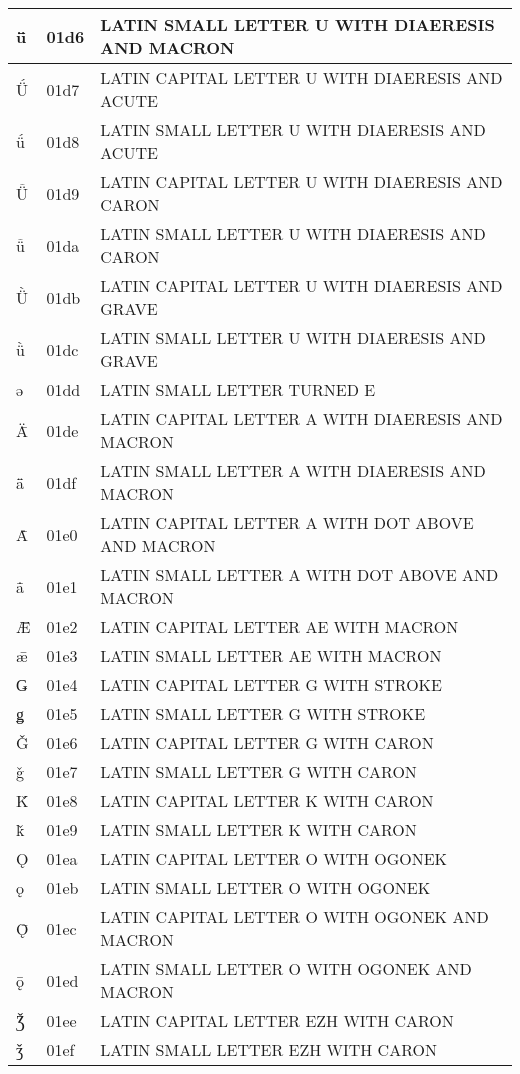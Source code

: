 \documentclass[12pt,letterpaper,openany]{book}
\begin{document}
\begin{center}
\begin{supertabular}{|m{0.25in}|m{0.5in}|m{4in}|}
			ǖ & 01d6 & LATIN SMALL LETTER U WITH DIAERESIS AND MACRON\\\hline
			Ǘ & 01d7 & LATIN CAPITAL LETTER U WITH DIAERESIS AND ACUTE\\\hline
			ǘ & 01d8 & LATIN SMALL LETTER U WITH DIAERESIS AND ACUTE\\\hline
			Ǚ & 01d9 & LATIN CAPITAL LETTER U WITH DIAERESIS AND CARON\\\hline
			ǚ & 01da & LATIN SMALL LETTER U WITH DIAERESIS AND CARON\\\hline
			Ǜ & 01db & LATIN CAPITAL LETTER U WITH DIAERESIS AND GRAVE\\\hline
			ǜ & 01dc & LATIN SMALL LETTER U WITH DIAERESIS AND GRAVE\\\hline
			ǝ & 01dd & LATIN SMALL LETTER TURNED E\\\hline
			Ǟ & 01de & LATIN CAPITAL LETTER A WITH DIAERESIS AND MACRON\\\hline
			ǟ & 01df & LATIN SMALL LETTER A WITH DIAERESIS AND MACRON\\\hline
			Ǡ & 01e0 & LATIN CAPITAL LETTER A WITH DOT ABOVE AND MACRON\\\hline
			ǡ & 01e1 & LATIN SMALL LETTER A WITH DOT ABOVE AND MACRON\\\hline
			Ǣ & 01e2 & LATIN CAPITAL LETTER AE WITH MACRON\\\hline
			ǣ & 01e3 & LATIN SMALL LETTER AE WITH MACRON\\\hline
			Ǥ & 01e4 & LATIN CAPITAL LETTER G WITH STROKE\\\hline
			ǥ & 01e5 & LATIN SMALL LETTER G WITH STROKE\\\hline
			Ǧ & 01e6 & LATIN CAPITAL LETTER G WITH CARON\\\hline
			ǧ & 01e7 & LATIN SMALL LETTER G WITH CARON\\\hline
			Ǩ & 01e8 & LATIN CAPITAL LETTER K WITH CARON\\\hline
			ǩ & 01e9 & LATIN SMALL LETTER K WITH CARON\\\hline
			Ǫ & 01ea & LATIN CAPITAL LETTER O WITH OGONEK\\\hline
			ǫ & 01eb & LATIN SMALL LETTER O WITH OGONEK\\\hline
			Ǭ & 01ec & LATIN CAPITAL LETTER O WITH OGONEK AND MACRON\\\hline
			ǭ & 01ed & LATIN SMALL LETTER O WITH OGONEK AND MACRON\\\hline
			Ǯ & 01ee & LATIN CAPITAL LETTER EZH WITH CARON\\\hline
			ǯ & 01ef & LATIN SMALL LETTER EZH WITH CARON\\\hline

\end{supertabular}
\end{center}
\end{document}
